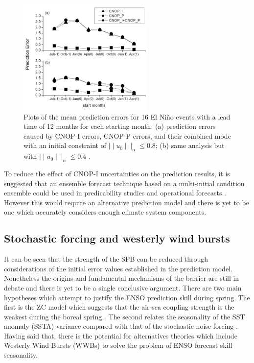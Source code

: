 \documentclass[12pt, onecolumn]{revtex4}    %
\begin{document}
\begin{figure}
\includegraphics[width=0.6\textwidth]{data/cnop}
\caption[CNOP]{Plots of the mean prediction errors for 16 El Ni\~{n}o events with a lead time of 12 months for each starting month: (a) prediction errors caused by CNOP-I errors, CNOP-P errors, and their combined mode with an initial constraint of $\mid \mid u_0 \mid \mid _\alpha \leq 0.8$; (b) same analysis but with $\mid \mid u_0 \mid \mid _\alpha \leq 0.4$ \citep{yu2012does}.}
\label{fig:cnop}
\end{figure}

To reduce the effect of CNOP-I uncertainties on the prediction results, it is suggested that an ensemble forecast technique based on a multi-initial condition ensemble could be used in predicability studies and operational forecasts \citep{kirtman2001current}. However this would require an alternative prediction model and there is yet to be one which accurately considers enough climate system components. 

\subsection{Stochastic forcing and westerly wind bursts}
\noindent
It can be seen that the strength of the SPB can be reduced through considerations of the initial error values established in the prediction model. Nonetheless the origins and fundamental mechanisms of the barrier are still in debate and there is yet to be a single conclusive argument. There are two main hypotheses which attempt to justify the ENSO prediction skill during spring. The first is the ZC model which suggests that the air-sea coupling strength is the weakest during the boreal spring \citep{Zebiak:1987aa}. The second relates the seasonality of the SST anomaly (SSTA) variance compared with that of the stochastic noise forcing \citep{webster1992monsoon, xue1994prediction}. Having said that, there is the potential for alternatives theories which include Westerly Wind Bursts (WWBs) to solve the problem of ENSO forecast skill seasonality. \\
\end{document}
